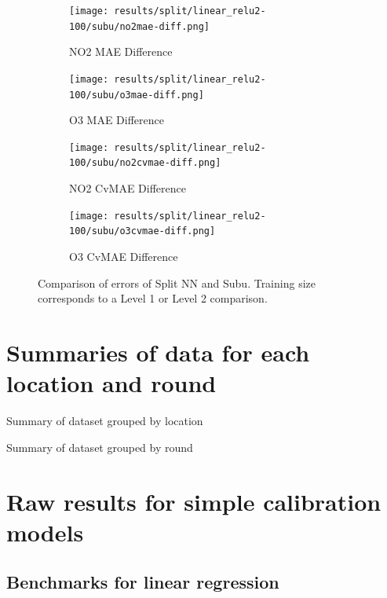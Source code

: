 \documentclass[journal abbreviation, manuscript]{copernicus}
\begin{document}
\begin{figure}[H]
\begin{subfigure}{0.49\textwidth}
\texttt{[image: results/split/linear\_relu2-100/subu/no2mae-diff.png]}
\caption{NO2 MAE Difference}
\end{subfigure}
\begin{subfigure}{0.49\textwidth}
\texttt{[image: results/split/linear\_relu2-100/subu/o3mae-diff.png]}
\caption{O3 MAE Difference}
\end{subfigure}
\begin{subfigure}{0.49\textwidth}
\texttt{[image: results/split/linear\_relu2-100/subu/no2cvmae-diff.png]}
\caption{NO2 CvMAE Difference}
\end{subfigure}
\begin{subfigure}{0.49\textwidth}
\texttt{[image: results/split/linear\_relu2-100/subu/o3cvmae-diff.png]}
\caption{O3 CvMAE Difference}
\end{subfigure}
\caption{Comparison of errors of Split NN and Subu. Training size corresponds to a Level 1 or Level 2 comparison.}
\end{figure}

\renewcommand{\thetable}{\Alph{section}.\arabic{table}}

\section{Summaries of data for each location and round}
\label{sec:summaryresults}

\begin{table}[H]
\scriptsize

\caption{Summary of dataset grouped by location}
\label{tab:locationsummary}
\end{table}

\begin{table}[H]
\scriptsize

\caption{Summary of dataset grouped by round}
\label{tab:roundsummary}
\end{table}

\section{Raw results for simple calibration models}
\label{sec:simpleresults}

\subsection{Benchmarks for linear regression}
\label{sec:results-lr}
\end{document}
